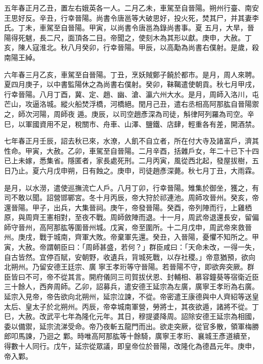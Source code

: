 \begin{pinyinscope}
 五年春正月乙丑，置左右娥英各一人。二月乙未，車駕至自晉陽。朔州行臺、南安王思好反。辛丑，行幸晉陽。尚書令唐邕等大破思好，投火死，焚其尸，并其妻李氏。丁未，車駕至自晉陽。甲寅，以尚書令唐邕為錄尚書事。夏
 五月，大旱，晉陽得死魃，長二尺，面頂各二目。帝聞之，使刻木為其形以獻。庚申，大赦。丁亥，陳人寇淮北。秋八月癸卯，行幸晉陽。甲辰，以高勱為尚書右僕射。是歲，殺南陽王綽。



 六年春三月乙亥，車駕至自晉陽。丁丑，烹妖賊鄭子饒於都市。是月，周人來聘。夏四月庚子，以中書監陽休之為尚書右僕射。癸卯，靺鞨遣使朝貢。秋七月甲戌，行幸晉陽。八月丁酉，冀、定、趙、幽、滄、瀛六州大水。是月，周師入洛川，屯芒山，攻逼洛城。縱火船焚浮橋，河橋絕。閏月己丑，遣右丞相高阿那肱自晉陽禦之，師次河陽，周師夜
 遁。庚辰，以司空趙彥深為司徒，斛律阿列羅為司空。辛巳，以軍國資用不足，稅關市、舟車、山澤、鹽鐵、店肆，輕重各有差，開酒禁。



 七年春正月壬辰，詔去秋已來，水潦，人飢不自立者，所在付大寺及諸富戶，濟其性命。甲寅，大赦。乙卯，車駕至自晉陽。二月辛酉，括雜戶女，年二十已下十四已上未嫁，悉集省。隱匿者，家長處死刑。二月丙寅，風從西北起，發屋拔樹，五日乃止。夏六月戊申朔，日有蝕之。庚申，司徒趙彥深薨。秋七月丁丑，大雨霖。



 是月，以水澇，遣使巡撫流亡人戶。八月丁卯，行幸晉陽。雉集於御坐，獲之，有
 司不敢以聞。詔營邯鄲宮。冬十月丙辰，帝大狩於祁連池。周師攻晉州。癸亥，帝還晉陽。甲子，出兵，大集晉祠。庚午，帝發晉陽。癸酉，帝列陣而行，上雞栖原，與周齊王憲相對，至夜不戰。周師斂陣而退。十一月，周武帝退還長安，留偏師守晉州，高阿那肱等圍晉州城。戊寅，帝至圍所。十二月戊申，周武帝來救晉州。庚戌，戰于城南，齊軍大敗。帝棄軍先還。癸丑，入晉陽，憂懼不知所之。甲寅，大赦。帝謂朝臣曰：「周師甚盛，若何？」群臣咸曰：「天命未改，一得一失，自古皆然。宜停百賦，安朝野，收遺兵，背城死戰，以存社稷。」帝意猶預，欲向北朔州。乃留安德王廷宗、廣
 寧王孝珩等守晉陽。若晉陽不守，即欲奔突厥。群臣皆曰不可，帝不從其言。開府儀同三司賀拔伏恩、封輔相、慕容鐘葵等宿衛近臣三十餘人，西奔周師。乙卯，詔募兵，遣安德王延宗為左廣，廣寧王孝珩為右廣。延宗入見帝，帝告欲向北朔州，延宗泣諫，不從。帝密遣王康德與中人齊紹等送皇太后、皇太子於北朔州。丙辰，帝幸城南軍營，勞將士，其夜欲遁，諸將不從。丁巳，大赦。改武平七年為隆化元年。其日，穆提婆降周。詔除安德王延宗為相國，委以備禦，延宗流涕受命。帝乃夜斬五龍門而出。欲走突厥，從官多散，領軍梅勝郎叩馬諫，乃迴之
 鄴。時唯高阿那肱等十餘騎，廣寧王孝珩、襄城王彥道續至，得數十人同行。戊午，延宗從眾議，即皇帝位於晉陽，改隆化為德昌元年。庚申，帝入鄴。




\end{pinyinscope}
